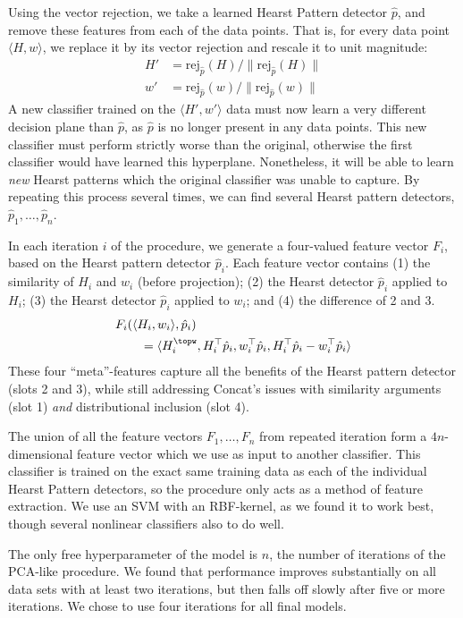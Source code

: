 \documentclass[letterpaper]{article}
\begin{document}
Using the vector rejection, we take a learned Hearst Pattern detector $\hat p$,
and remove these features from each of the data points. That is, for every data
point $\langle H, w\rangle$, we replace it by its vector rejection and rescale
it to unit magnitude:
\begin{align*}
  H' & = \text{rej}_{\hat p}(H) / \|\text{rej}_{\hat p}(H)\|\\
  w' & = \text{rej}_{\hat p}(w) / \|\text{rej}_{\hat p}(w)\|
\end{align*}
A new classifier trained on the $\langle H', w'\rangle$ data must now learn
a very different decision plane than $\hat p$, as $\hat p$ is no longer present
in any data points. This new classifier must perform strictly worse than the
original, otherwise the first classifier would have learned this hyperplane.
Nonetheless, it will be able to learn {\em new} Hearst patterns which the
original classifier was unable to capture. By repeating this process several
times, we can find several Hearst pattern detectors, $\hat p_1, \ldots, \hat
p_n$.

In each iteration $i$ of the procedure, we generate a four-valued feature vector
$F_i$, based on the Hearst pattern detector $\hat p_i$. Each
feature vector contains (1) the similarity of $H_i$ and $w_i$ (before projection);
(2) the Hearst detector
$\hat p_i$ applied to $H_i$; (3) the Hearst detector $\hat p_i$ applied to $w_i$; and
(4) the difference of 2 and 3.
\begin{align*}
  & F_i(\langle H_i, w_i\rangle, \hat p_i)\\
  & \qquad = \langle H_i^\topw, H_i^\top\hat p_i, w_i^\top\hat p_i, H_i^\top\hat p_i - w_i^\top\hat p_i\rangle
\end{align*}
These four ``meta''-features capture all the benefits of the Hearst pattern
detector (slots 2 and 3), while still addressing Concat's issues with
similarity arguments (slot 1) {\em and} distributional inclusion (slot 4).

The union of all the feature vectors $F_1, \ldots, F_n$ from repeated iteration form a
$4n$-dimensional feature vector which we use as input to another classifier.
This classifier is trained on the exact same training data as each of the
individual Hearst Pattern detectors, so the procedure only acts as a method of
feature extraction. We use an SVM with an RBF-kernel, as we found it to work
best, though several nonlinear classifiers also to do well.

The only free hyperparameter of the model is $n$, the number of iterations of
the PCA-like procedure. We found that performance improves substantially on all
data sets with at least two iterations, but then falls off slowly after five or
more iterations. We chose to use four iterations for all final models.
\end{document}
